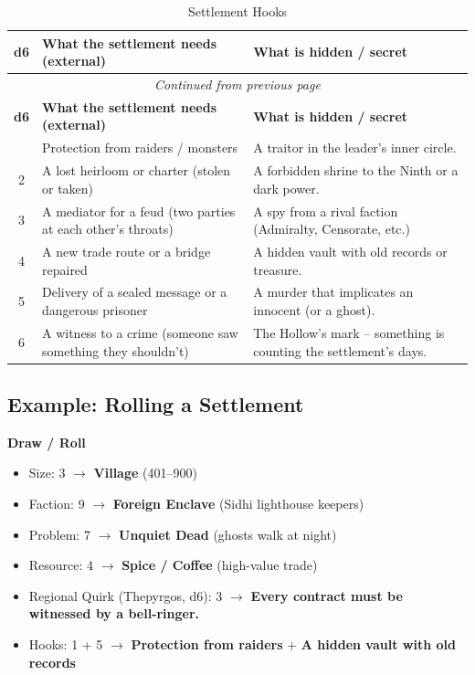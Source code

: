 \begin{center}
\begin{longtable}{cll}
\caption{Settlement Hooks}\\
\toprule
\textbf{d6} & \textbf{What the settlement needs (external)} & \textbf{What is hidden / secret} \\
\midrule
\endfirsthead
\multicolumn{3}{c}{\emph{Continued from previous page}} \\
\toprule
\textbf{d6} & \textbf{What the settlement needs (external)} & \textbf{What is hidden / secret} \\
\midrule
\endhead
\bottomrule
\endfoot
1 & Protection from raiders / monsters & A traitor in the leader's inner circle. \\
2 & A lost heirloom or charter (stolen or taken) & A forbidden shrine to the Ninth or a dark power. \\
3 & A mediator for a feud (two parties at each other's throats) & A spy from a rival faction (Admiralty, Censorate, etc.) \\
4 & A new trade route or a bridge repaired & A hidden vault with old records or treasure. \\
5 & Delivery of a sealed message or a dangerous prisoner & A murder that implicates an innocent (or a ghost). \\
6 & A witness to a crime (someone saw something they shouldn't) & The Hollow's mark -- something is counting the settlement's days. \\
\end{longtable}
\end{center}

\subsection{Example: Rolling a Settlement}
\label{sec:settlement-example}

\textbf{Draw / Roll}
\begin{itemize}
  \item Size: 3 $\rightarrow$ \textbf{Village} (401--900)
  \item Faction: 9 $\rightarrow$ \textbf{Foreign Enclave} (Sidhi lighthouse keepers)
  \item Problem: 7 $\rightarrow$ \textbf{Unquiet Dead} (ghosts walk at night)
  \item Resource: 4 $\rightarrow$ \textbf{Spice / Coffee} (high-value trade)
  \item Regional Quirk (Thepyrgos, d6): 3 $\rightarrow$ \textbf{Every contract must be witnessed by a bell-ringer.}
  \item Hooks: 1 + 5 $\rightarrow$ \textbf{Protection from raiders} + \textbf{A hidden vault with old records}
\end{itemize}

